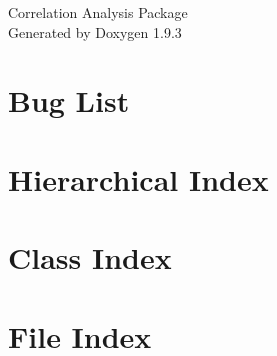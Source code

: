 \documentclass[twoside]{book}
\newcommand{\+}{\discretionary{\mbox{\scriptsize$\hookleftarrow$}}{}{}}
\newcommand{\clearemptydoublepage}{%
    \newpage{\pagestyle{empty}\cleardoublepage}%
  }
\begin{document}
  \raggedbottom
    \hypersetup{pageanchor=false,
                bookmarksnumbered=true,
                pdfencoding=unicode
               }
  \begin{titlepage}
  \vspace*{7cm}
  \begin{center}%
  {\Large Correlation Analysis Package}\\
  \vspace*{1cm}
  {\large Generated by Doxygen 1.9.3}\\
  \end{center}
  \end{titlepage}
  \clearemptydoublepage
  \tableofcontents
  \clearemptydoublepage
  \hypersetup{pageanchor=true}
\chapter{Bug List}
\label{bug}

\chapter{Hierarchical Index}

\chapter{Class Index}

\chapter{File Index}

\end{document}
